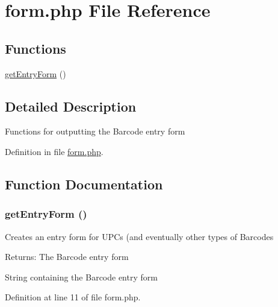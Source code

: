 \hypertarget{form_8php}{
\section{form.php File Reference}
\label{form_8php}
}
\subsection*{Functions}
\begin{CompactItemize}
\item 
\hyperlink{form_8php_839e205cae656bea01ea99e2de94ef1e}{getEntryForm} ()
\end{CompactItemize}


\subsection{Detailed Description}
Functions for outputting the Barcode entry form 

Definition in file \hyperlink{form_8php-source}{form.php}.

\subsection{Function Documentation}
\hypertarget{form_8php_839e205cae656bea01ea99e2de94ef1e}{
\subsubsection{\setlength{\rightskip}{0pt plus 5cm}getEntryForm ()}}
\label{form_8php_839e205cae656bea01ea99e2de94ef1e}


Creates an entry form for UPCs (and eventually other types of Barcodes

\begin{Desc}
\item[Returns:]The Barcode entry form \end{Desc}


String containing the Barcode entry form 

Definition at line 11 of file form.php.